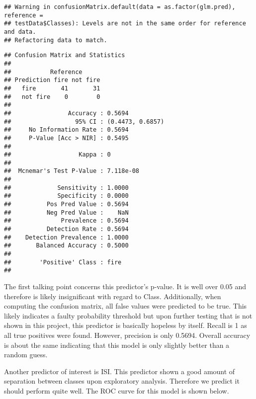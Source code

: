\documentclass[
]{article}
\newenvironment{Shaded}{\begin{snugshade}}{\end{snugshade}}
\newcommand{\AttributeTok}[1]{\textcolor[rgb]{0.13,0.29,0.53}{#1}}
\newcommand{\ConstantTok}[1]{\textcolor[rgb]{0.56,0.35,0.01}{#1}}
\newcommand{\FunctionTok}[1]{\textcolor[rgb]{0.13,0.29,0.53}{\textbf{#1}}}
\newcommand{\NormalTok}[1]{#1}
\newcommand{\OtherTok}[1]{\textcolor[rgb]{0.56,0.35,0.01}{#1}}
\newcommand{\SpecialCharTok}[1]{\textcolor[rgb]{0.81,0.36,0.00}{\textbf{#1}}}
\newcommand{\StringTok}[1]{\textcolor[rgb]{0.31,0.60,0.02}{#1}}
\begin{document}
\begin{verbatim}
## Warning in confusionMatrix.default(data = as.factor(glm.pred), reference =
## testData$Classes): Levels are not in the same order for reference and data.
## Refactoring data to match.
\end{verbatim}

\begin{verbatim}
## Confusion Matrix and Statistics
## 
##           Reference
## Prediction fire not fire
##   fire       41       31
##   not fire    0        0
##                                           
##                Accuracy : 0.5694          
##                  95% CI : (0.4473, 0.6857)
##     No Information Rate : 0.5694          
##     P-Value [Acc > NIR] : 0.5495          
##                                           
##                   Kappa : 0               
##                                           
##  Mcnemar's Test P-Value : 7.118e-08       
##                                           
##             Sensitivity : 1.0000          
##             Specificity : 0.0000          
##          Pos Pred Value : 0.5694          
##          Neg Pred Value :    NaN          
##              Prevalence : 0.5694          
##          Detection Rate : 0.5694          
##    Detection Prevalence : 1.0000          
##       Balanced Accuracy : 0.5000          
##                                           
##        'Positive' Class : fire            
## 
\end{verbatim}

The first talking point concerns this predictor's p-value. It is well
over 0.05 and therefore is likely insignificant with regard to Class.
Additionally, when computing the confusion matrix, all false values were
predicted to be true. This likely indicates a faulty probability
threshold but upon further testing that is not shown in this project,
this predictor is basically hopeless by itself. Recall is 1 as all true
positives were found. However, precision is only 0.5694. Overall
accuracy is about the same indicating that this model is only slightly
better than a random guess.

Another predictor of interest is ISI. This predictor shown a good amount
of separation between classes upon exploratory analysis. Therefore we
predict it should perform quite well. The ROC curve for this model is
shown below.

\begin{Shaded}
\end{Shaded}
\end{document}
